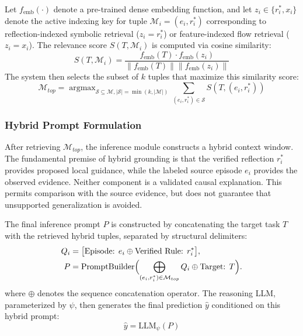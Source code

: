 \documentclass[journal]{IEEEtran}
\theoremstyle{definition}
\theoremstyle{remark}
\begin{document}
Let $f_{\mathrm{emb}}(\cdot)$ denote a pre-trained dense embedding function, and let $z_i \in \{r_i^*, x_i\}$ denote the active indexing key for tuple $\mathcal{M}_i = (e_i, r_i^*)$ corresponding to reflection-indexed symbolic retrieval ($z_i = r_i^*$) or feature-indexed flow retrieval ($z_i = x_i$). The relevance score $S(T, \mathcal{M}_i)$ is computed via cosine similarity:
\begin{equation}
    S(T, \mathcal{M}_i) = \frac{f_{\mathrm{emb}}(T) \cdot f_{\mathrm{emb}}(z_i)}{\|f_{\mathrm{emb}}(T)\| \|f_{\mathrm{emb}}(z_i)\|}
\end{equation}
The system then selects the subset of $k$ tuples that maximize this similarity score:
\begin{equation}
    \mathcal{M}_{top} = \mathop{\arg\max}_{\mathcal{S} \subseteq \mathcal{M}, |\mathcal{S}|=\min(k,|\mathcal{M}|)} \sum_{(e_i, r_i^*) \in \mathcal{S}} S(T, (e_i, r_i^*))
\end{equation}

\subsubsection{Hybrid Prompt Formulation}
After retrieving $\mathcal{M}_{top}$, the inference module constructs a hybrid context window. The fundamental premise of hybrid grounding is that the verified reflection $r_i^*$ provides proposed local guidance, while the labeled source episode $e_i$ provides the observed evidence. Neither component is a validated causal explanation. This permits comparison with the source evidence, but does not guarantee that unsupported generalization is avoided.

The final inference prompt $P$ is constructed by concatenating the target task $T$ with the retrieved hybrid tuples, separated by structural delimiters:
\begin{equation}
\begin{aligned}
    Q_i &= \big[\text{Episode: }e_i \oplus \text{Verified Rule: }r_i^*\big],\\
    P &= \text{PromptBuilder}\Bigl(
    \bigoplus_{(e_i,r_i^*)\in\mathcal{M}_{top}} Q_i
    \oplus \text{Target: }T\Bigr).
\end{aligned}
\end{equation}
where $\oplus$ denotes the sequence concatenation operator. The reasoning LLM, parameterized by $\psi$, then generates the final prediction $\hat{y}$ conditioned on this hybrid prompt:
\begin{equation}
    \hat{y} = \text{LLM}_\psi(P)
\end{equation}
\end{document}
